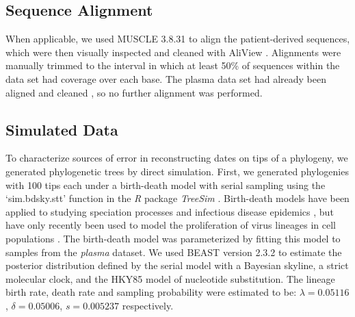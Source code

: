 \documentclass[12pt]{article}
\begin{document}
\subsection * {Sequence Alignment} \label{subsec:seqalign}
When applicable, we used MUSCLE 3.8.31 \citep{Muscle04} to align the patient-derived sequences, which were then visually inspected and cleaned with AliView \citep{AliView14}. 
Alignments were manually trimmed to the interval in which at least  50\% of sequences within the data set had coverage over each base.
The plasma data set had already been aligned and cleaned \citep{McCloskey14}, so no further alignment was performed.

\subsection * {Simulated Data} \label{subsec:simdata}


To characterize sources of error in reconstructing dates on tips of a phylogeny, we generated phylogenetic trees by direct simulation. %
First, we generated phylogenies with 100 tips each under a birth-death model with serial sampling using the `sim.bdsky.stt' function in the \textit{R} package \textit{TreeSim} \citep{Boskova14}.
Birth-death models have been applied to studying speciation processes \citep{Nee:2006} and infectious disease epidemics \citep{Stradler13}, but have only recently been used to model the proliferation of virus lineages in cell populations \citep{Hartfield:2015}.
The birth-death model was parameterized by fitting this model to samples from the {\em plasma} dataset.
We used BEAST version 2.3.2 to estimate the posterior distribution defined by the serial model with a Bayesian skyline, a strict molecular clock, and the HKY85 \citep{HKY85} model of nucleotide substitution.
The lineage birth rate, death rate and sampling probability were estimated to be: $\lambda = 0.05116$, $\delta = 0.05006$, $s = 0.005237$ respectively.
\end{document}
